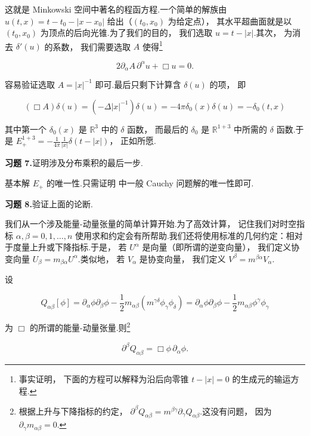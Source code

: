 这就是 Minkowski 空间中著名的程函方程.一个简单的解族由 $u(t, x) = t-t_{0}-|x-x_{0}|$ 给出（$(t_{0}, x_{0})$ 为给定点）， 其水平超曲面就是以 $(t_{0}, x_{0})$ 为顶点的后向光锥.为了我们的目的， 我们选取 $u = t-|x|$.其次， 为消去 $\delta'(u)$ 的系数， 我们需要选取 $A$ 使得\footnote{事实证明， 下面的方程可以解释为沿后向零锥 $t-|x| = 0$ 的生成元的输运方程.}

\[
2\partial_{\alpha}A\, \partial^{\alpha}u + \Box u = 0.
\]

容易验证选取 $A = |x|^{-1}$ 即可.最后只剩下计算含 $\delta(u)$ 的项， 即

\[
(\Box A)\delta(u) = (-\Delta|x|^{-1})\delta(u) = -4\pi\delta_{0}(x)\delta(u) = -\delta_{0}(t, x)
\]

其中第一个 $\delta_{0}(x)$ 是 $\mathbb{R}^{3}$ 中的 $\delta$ 函数， 而最后的 $\delta_{0}$ 是 $\mathbb{R}^{1+3}$ 中所需的 $\delta$ 函数.于是 $E_{+}^{1+3} = -\frac{1}{4\pi}\frac{1}{|x|}\delta(t-|x|)$， 正如所愿.

\noindent\textbf{习题 7.}\quad 证明涉及分布乘积的最后一步.

基本解 $E_{+}$ 的唯一性.只需证明 中一般 Cauchy 问题解的唯一性即可.

\noindent\textbf{习题 8.}\quad 验证上面的论断.

我们从一个涉及能量-动量张量的简单计算开始.为了高效计算， 记住我们对时空指标 $\alpha, \beta = 0, 1, \ldots, n$ 使用求和约定会有所帮助.我们还将使用标准的几何约定：相对于度量上升或下降指标.于是， 若 $U^{\alpha}$ 是向量（即所谓的逆变向量）， 我们定义协变向量 $U_{\beta} = m_{\beta\alpha}U^{\alpha}$.类似地， 若 $V_{\alpha}$ 是协变向量， 我们定义 $V^{\beta} = m^{\beta\alpha}V_{\alpha}$.

\begin{proposition}\label{prop:c4-3.3}
设

\begin{equation}
Q_{\alpha\beta}[\phi] = \partial_{\alpha}\phi\partial_{\beta}\phi - \frac{1}{2}m_{\alpha\beta}\left(m^{\gamma\delta}\phi_{\gamma}\phi_{\delta}\right) = \partial_{\alpha}\phi\partial_{\beta}\phi - \frac{1}{2}m_{\alpha\beta}\phi^{\gamma}\phi_{\gamma}\label{eq:c4-150}
\end{equation}

为 $\Box$ 的所谓的能量-动量张量.则\footnote{根据上升与下降指标的约定， $\partial^{\beta}Q_{\alpha\beta} = m^{\beta\gamma}\partial_{\gamma}Q_{\alpha\beta}$.这没有问题， 因为 $\partial_{\gamma}m_{\alpha\beta} = 0$.}

\begin{equation}
\partial^{\beta}Q_{\alpha\beta} = \Box\phi\, \partial_{\alpha}\phi.\label{eq:c4-151}
\end{equation}
\end{proposition}

